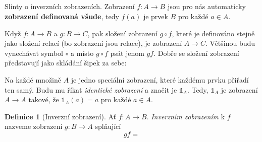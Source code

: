 \documentclass[a4paper,11pt]{article}
\title{\Huge\textsf{}\\
 \Large\textsf{}
 \author{}
 \date{}
}
\theoremstyle{definition}
\newtheorem*{defin}{Definice}
\begin{document}
Slinty o inverzních zobrazeních. Zobrazení $f:A \to B$ jsou pro nás automaticky
\textbf{zobrazení definovaná všude}, tedy $f(a)$ je prvek $B$ pro každé $a \in
A$.

Když $f:A \to B$ a $g:B \to C$, pak složení zobrazení $g \circ f$, které je
definováno stejně jako složení relací (bo zobrazení jsou relace), je zobrazení
$A \to C$. Většinou budu vynechávat symbol $ \circ $ a místo $g \circ f$ psát
jenom $gf$. Dobře se složení zobrazení představují jako skládání šipek za sebe:
\begin{center}
\end{center}

Na každé množině $A$ je jedno speciální zobrazení, které každému prvku přiřadí
ten samý. Budu mu říkat \emph{identické zobrazení} a značit je $\mathds{1}_A$.
Tedy, $\mathds{1}_A$ je zobrazení $A \to A$ takové, že $\mathds{1}_A(a) = a$ pro
každé $a \in A$.

\begin{defin}[Inverzní zobrazení]
 Ať $f:A \to B$. \emph{Inverzním zobrazením} k $f$ nazveme zobrazení $g:B \to A$
 splňující
 \[
  gf = 
 \]
 
\end{defin}
\end{document}
